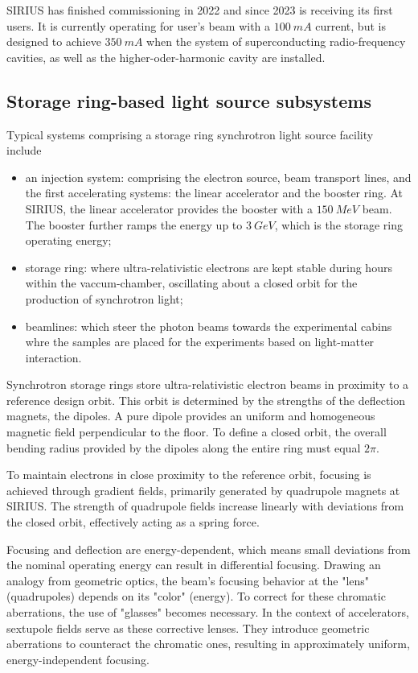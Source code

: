 SIRIUS has finished commissioning in 2022 and since 2023 is receiving its first users. It is currently operating for user's beam with a $100~\unit{mA}$ current, but is designed to achieve $350~\unit{mA}$ when the system of superconducting radio-frequency cavities, as well as the higher-oder-harmonic cavity are installed.

\subsection{Storage ring-based light source subsystems}
Typical systems comprising a storage ring synchrotron light source facility include
\begin{itemize}
    \item an injection system: comprising the electron source, beam transport lines, and the first accelerating systems: the linear accelerator and the booster ring. At SIRIUS, the linear accelerator provides the booster with a $150~\unit{MeV}$ beam. The booster further ramps the energy up to $3~\unit{GeV}$, which is the storage ring operating energy;
    \item storage ring: where ultra-relativistic electrons are kept stable during hours within the vaccum-chamber, oscillating about a closed orbit for the production of synchrotron light;
    \item beamlines: which steer the photon beams towards the experimental cabins whre the samples are placed for the experiments based on light-matter interaction.
\end{itemize}

Synchrotron storage rings store ultra-relativistic electron beams in proximity to a reference design orbit. This orbit is determined by the strengths of the deflection magnets, the dipoles. A pure dipole provides an uniform and homogeneous magnetic field perpendicular to the floor.
To define a closed orbit, the overall bending radius provided by the dipoles along the entire ring must equal $2\pi$.

To maintain electrons in close proximity to the reference orbit, focusing is achieved through gradient fields, primarily generated by quadrupole magnets at SIRIUS. The strength of quadrupole fields increase linearly with deviations from the closed orbit, effectively acting as a spring force.

Focusing and deflection are energy-dependent, which means small deviations from the nominal operating energy can result in differential focusing. Drawing an analogy from geometric optics, the beam's focusing behavior at the "lens" (quadrupoles) depends on its "color" (energy). To correct for these chromatic aberrations, the use of "glasses" becomes necessary. In the context of accelerators, sextupole fields serve as these corrective lenses. They introduce geometric aberrations to counteract the chromatic ones, resulting in approximately uniform, energy-independent focusing.

